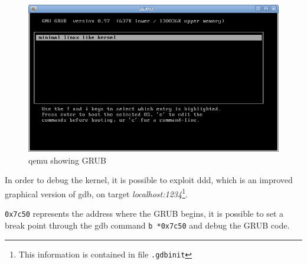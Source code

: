 \documentclass{report}
\begin{document}
\begin{figure}[hbtp]
\centering
\includegraphics[scale=0.35]{images/es01/02_qemu_grub.png}
\caption{qemu showing GRUB}
\end{figure}

In order to debug the kernel, it is possible to exploit ddd, which is an improved graphical version of gdb, on target \emph{localhost:1234}\footnote{This information is contained in file \texttt{.gdbinit}}.

\texttt{0x7c50} represents the address where the GRUB begins, it is possible to set a break point through the gdb command \texttt{b *0x7c50} and debug the GRUB code.
\end{document}
